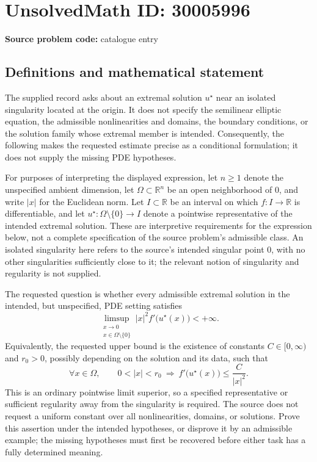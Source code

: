 \documentclass[11pt]{article}
\newcommand{\R}{\mathbb{R}}
\begin{document}
\section*{UnsolvedMath ID: 30005996}
\textbf{Source problem code:} catalogue entry
\subsection{Definitions and mathematical statement}
The supplied record asks about an extremal solution \(u^\star\) near an isolated singularity located at the origin. It does not specify the semilinear elliptic equation, the admissible nonlinearities and domains, the boundary conditions, or the solution family whose extremal member is intended. Consequently, the following makes the requested estimate precise as a conditional formulation; it does not supply the missing PDE hypotheses.

For purposes of interpreting the displayed expression, let \(n\geq 1\) denote the unspecified ambient dimension, let \(\Omega\subset\R^n\) be an open neighborhood of \(0\), and write \(|x|\) for the Euclidean norm. Let \(I\subset\R\) be an interval on which \(f:I\to\R\) is differentiable, and let \(u^\star:\Omega\setminus\{0\}\to I\) denote a pointwise representative of the intended extremal solution. These are interpretive requirements for the expression below, not a complete specification of the source problem's admissible class. An isolated singularity here refers to the source's intended singular point \(0\), with no other singularities sufficiently close to it; the relevant notion of singularity and regularity is not supplied.

The requested question is whether every admissible extremal solution in the intended, but unspecified, PDE setting satisfies
\[
\limsup_{\substack{x\to 0\\x\in\Omega\setminus\{0\}}}
|x|^2 f'\bigl(u^\star(x)\bigr)<+\infty.
\]
Equivalently, the requested upper bound is the existence of constants \(C\in[0,\infty)\) and \(r_0>0\), possibly depending on the solution and its data, such that
\[
\forall x\in\Omega,\qquad
0<|x|<r_0\ \Longrightarrow\
f'\bigl(u^\star(x)\bigr)\leq \frac{C}{|x|^2}.
\]
This is an ordinary pointwise limit superior, so a specified representative or sufficient regularity away from the singularity is required. The source does not request a uniform constant over all nonlinearities, domains, or solutions. Prove this assertion under the intended hypotheses, or disprove it by an admissible example; the missing hypotheses must first be recovered before either task has a fully determined meaning.
\end{document}
